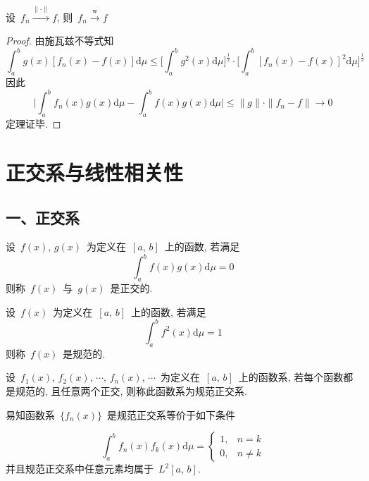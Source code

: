 \begin{Theorem}\label{weak}
设~$f_{n}\xrightarrow{\mathrm{\|\cdot\|}} f$, 则~$f_n\xrightarrow{\mathrm{~w~}} f$
\end{Theorem}

\begin{proof}
由施瓦兹不等式知
\[
\int_{a}^{b}g(x)[f_{n}(x)-f(x)]\mathrm{d}\mu
\leqslant \Big[\int_a^{b}g^{2}(x)\mathrm{d}\mu\Big]^{\frac{1}{2}}\cdot\Big[\int_a^{b}[f_n(x)-f(x)]^{2}\mathrm{d}\mu\Big]^{\frac{1}{2}}
\]
因此
\[
\Big|\int_{a}^{b}f_{n}(x)g(x)\mathrm{d}\mu- \int_{a}^{b}f(x)g(x)\mathrm{d}\mu\Big|\leqslant \|g\|\cdot\|f_{n}-f\|\longrightarrow 0
\]
定理证毕.
\end{proof}

\section{正交系与线性相关性}

\subsection*{一、正交系}

\begin{Definition}\label{Def-6-6}

设~$f(x),\, g(x)$~为定义在~$\left[a,\,b\right]$~上的函数, 若满足
\[
\int_{a}^{b}f(x)g(x)\mathrm{d}\mu=0
\]
则称~$f(x)$~与~$g(x)$~是正交的.
\end{Definition}


\begin{Definition}\label{Def-6-7}

设~$f(x)$~为定义在~$\left[a,\,b\right]$~上的函数, 若满足
\[
\int_{a}^{b}f^{2}(x)\mathrm{d}\mu=1
\]
则称~$f(x)$~是规范的.
\end{Definition}



\begin{Definition}\label{Def-6-8}
设~$f_{1}(x), \, f_{2}(x), \, \cdots, \, f_{n}(x), \, \cdots$~为定义在~$\left[a,\,b\right]$~上的函数系, 若每个函数都是规范的, 且任意两个正交, 则称此函数系为规范正交系.
\end{Definition}


易知函数系~$\{f_{n}(x)\}$~是规范正交系等价于如下条件

\[
\int_{a}^{b}f_{n}(x)f_{k}(x)\mathrm{d}\mu= \left\{ \!\!
\begin{array}{ll}
1, & n=k \\[0.2cm]
0, & n\neq k
\end{array}
\right.
\]
并且规范正交系中任意元素均属于~$L^2[a,\,b]$.

